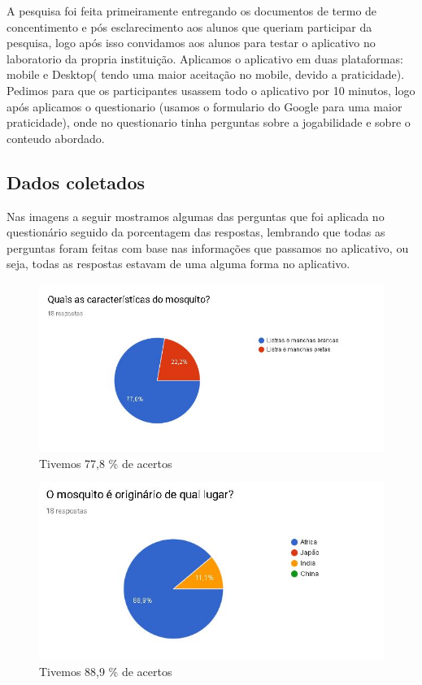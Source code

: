 \documentclass[12pt]{article}
\begin{document}
		A pesquisa foi feita primeiramente entregando os documentos de termo de concentimento e pós esclarecimento aos alunos que queriam participar da pesquisa, logo após isso convidamos aos alunos para testar o aplicativo no laboratorio da propria instituição. Aplicamos o aplicativo em duas plataformas: mobile e Desktop( tendo uma maior aceitação no mobile, devido a praticidade). Pedimos para que os participantes usassem todo o aplicativo por 10 minutos, logo após aplicamos o questionario (usamos o formulario do Google para uma maior praticidade), onde no questionario tinha perguntas sobre a jogabilidade e sobre o conteudo abordado.\\
		
		
		
		
	\subsection{Dados coletados} %
		Nas imagens a seguir mostramos algumas das perguntas que foi aplicada no questionário seguido da porcentagem das respostas, lembrando que todas as perguntas foram feitas com base nas informações que passamos no aplicativo, ou seja, todas as respostas estavam de uma alguma forma no aplicativo. 
		
		
		\begin{figure}[H]
			\centering
			\caption{Tivemos 77,8 \% de acertos}
			\includegraphics[width=0.7\linewidth]{Figuras/Pergunta_1}
			
			\label{fig:pergunta1}
		\end{figure}
	
		\begin{figure}[H]
			\centering
			\caption{Tivemos 88,9 \% de acertos}
			\includegraphics[width=0.7\linewidth]{Figuras/Pergunta_2}
			
			\label{fig:pergunta2}
		\end{figure}
		
\end{document}
